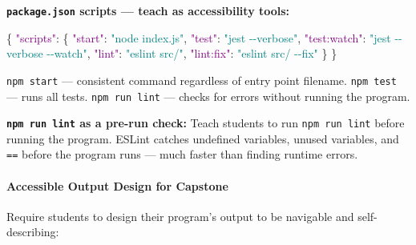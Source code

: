\documentclass[
  justified,
  openright,
]{tufte-book}
\let\subsubsection\paragraph
\let\paragraph\paragraph
\newcommand{\DataTypeTok}[1]{\textcolor{Purple}{#1}}
\newcommand{\FunctionTok}[1]{\textcolor{BrandBlue}{#1}}
\newcommand{\StringTok}[1]{\textcolor{Teal}{#1}}
\newenvironment{Shaded}{%
  \begin{snugshade}
}{%
  \end{snugshade}
}
\let\subsubsection\paragraph
\let\paragraph\paragraph
\begin{document}
\textbf{\texttt{package.json} scripts --- teach as accessibility tools:}

\begin{Shaded}
\begin{Highlighting}[]
\FunctionTok{\{}
  \DataTypeTok{"scripts"}\FunctionTok{:} \FunctionTok{\{}
    \DataTypeTok{"start"}\FunctionTok{:} \StringTok{"node index.js"}\FunctionTok{,}
    \DataTypeTok{"test"}\FunctionTok{:} \StringTok{"jest {-}{-}verbose"}\FunctionTok{,}
    \DataTypeTok{"test:watch"}\FunctionTok{:} \StringTok{"jest {-}{-}verbose {-}{-}watch"}\FunctionTok{,}
    \DataTypeTok{"lint"}\FunctionTok{:} \StringTok{"eslint src/"}\FunctionTok{,}
    \DataTypeTok{"lint:fix"}\FunctionTok{:} \StringTok{"eslint src/ {-}{-}fix"}
  \FunctionTok{\}}
\FunctionTok{\}}
\end{Highlighting}
\end{Shaded}

\texttt{npm\ start} --- consistent command regardless of entry point
filename. \texttt{npm\ test} --- runs all tests. \texttt{npm\ run\ lint}
--- checks for errors without running the program.

\textbf{\texttt{npm\ run\ lint} as a pre-run check:} Teach students to
run \texttt{npm\ run\ lint} before running the program. ESLint catches
undefined variables, unused variables, and \texttt{==} before the
program runs --- much faster than finding runtime errors.

\subsubsection{Accessible Output Design for
Capstone}\label{accessible-output-design-for-capstone}

Require students to design their program's output to be navigable and
self-describing:
\end{document}
